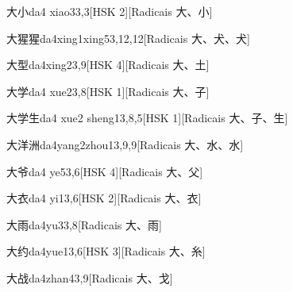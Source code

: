 \begin{entry}{大小}{da4 xiao3}{3,3}[HSK 2][Radicais ⼤、⼩]
\end{entry}

\begin{entry}{大猩猩}{da4xing1xing5}{3,12,12}[Radicais ⼤、⽝、⽝]
\end{entry}

\begin{entry}{大型}{da4xing2}{3,9}[HSK 4][Radicais ⼤、⼟]
\end{entry}

\begin{entry}{大学}{da4 xue2}{3,8}[HSK 1][Radicais ⼤、⼦]
\end{entry}

\begin{entry}{大学生}{da4 xue2 sheng1}{3,8,5}[HSK 1][Radicais ⼤、⼦、⽣]
\end{entry}

\begin{entry}{大洋洲}{da4yang2zhou1}{3,9,9}[Radicais ⼤、⽔、⽔]
\end{entry}

\begin{entry}{大爷}{da4 ye5}{3,6}[HSK 4][Radicais ⼤、⽗]
\end{entry}

\begin{entry}{大衣}{da4 yi1}{3,6}[HSK 2][Radicais ⼤、⾐]
\end{entry}

\begin{entry}{大雨}{da4yu3}{3,8}[Radicais ⼤、⾬]
\end{entry}

\begin{entry}{大约}{da4yue1}{3,6}[HSK 3][Radicais ⼤、⽷]
\end{entry}

\begin{entry}{大战}{da4zhan4}{3,9}[Radicais ⼤、⼽]
\end{entry}

